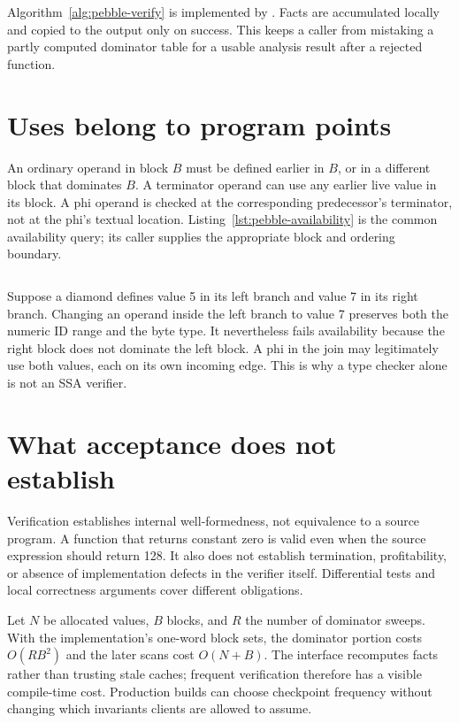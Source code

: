 Algorithm~\ref{alg:pebble-verify} is implemented by .
Facts are accumulated locally and copied to the output only on success.
This keeps a caller from mistaking a partly computed dominator table for a usable analysis result after a rejected function.

\section{Uses belong to program points}
\label{sec:pebble-use-points}
An ordinary operand in block $B$ must be defined earlier in $B$, or in a different block that dominates $B$.
A terminator operand can use any earlier live value in its block.
A phi operand is checked at the corresponding predecessor's terminator, not at the phi's textual location.
Listing~\ref{lst:pebble-availability} is the common availability query; its caller supplies the appropriate block and ordering boundary.

\begin{listing}[htbp]
\inputminted[firstline=50,lastline=56]{c}{example-code/pebbleir/pebbleir.c}
\caption{Availability combines live-ID validation, block dominance, and same-block order.}
\label{lst:pebble-availability}
\end{listing}

Suppose a diamond defines value 5 in its left branch and value 7 in its right branch.
Changing an operand inside the left branch to value 7 preserves both the numeric ID range and the byte type.
It nevertheless fails availability because the right block does not dominate the left block.
A phi in the join may legitimately use both values, each on its own incoming edge.
This is why a type checker alone is not an SSA verifier.

\section{What acceptance does not establish}
\label{sec:pebble-verify-limits}
Verification establishes internal well-formedness, not equivalence to a source program.
A function that returns constant zero is valid even when the source expression should return 128.
It also does not establish termination, profitability, or absence of implementation defects in the verifier itself.
Differential tests and local correctness arguments cover different obligations.

Let $N$ be allocated values, $B$ blocks, and $R$ the number of dominator sweeps.
With the implementation's one-word block sets, the dominator portion costs $O(RB^2)$ and the later scans cost $O(N+B)$.
The interface recomputes facts rather than trusting stale caches; frequent verification therefore has a visible compile-time cost.
Production builds can choose checkpoint frequency without changing which invariants clients are allowed to assume.

